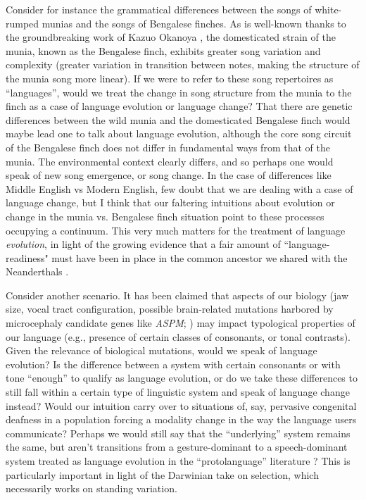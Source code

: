 Consider for instance the grammatical differences between the songs of white-rumped munias and the songs of Bengalese finches. 
As is well-known thanks to the groundbreaking work of Kazuo Okanoya \citep{okanoya2004bengalese,okanoya2017sexual}, the domesticated strain of the munia, known as the Bengalese finch, exhibits greater song variation and complexity (greater variation in transition between notes, making the structure of the munia song more linear). If we were to refer to these song repertoires as ``languages'', would we treat the change in song structure from the munia to the finch as a case of language evolution or language change? That there are genetic differences between the wild munia and the domesticated Bengalese finch would maybe lead one to talk about language evolution, although the core song circuit of the Bengalese finch does not differ in fundamental ways from that of the munia. The environmental context clearly differs, and so perhaps one would speak of new song emergence, or song change. In the case of differences like Middle English vs Modern English, few doubt that we are dealing with a case of language change, but I think that our faltering intuitions about evolution or change in the munia vs. Bengalese finch situation point to these processes occupying a continuum. This very much matters for the treatment of language \textit{evolution}, in light of the growing evidence that a fair amount of ``language-readiness" must have been in place in the common ancestor we shared with the Neanderthals \citep{dediu2013antiquity}.

Consider another scenario. It has been claimed that aspects of our biology (jaw size, vocal tract configuration, possible brain-related mutations harbored by microcephaly candidate genes like \textit{ASPM}; \cite{dediu2017language,blasi2019human,dediu2007linguistic,dediu2021tone}) may impact typological properties of our language (e.g., presence of certain classes of consonants, or tonal contrasts). Given the relevance of biological mutations, would we speak of language evolution? Is the difference between a system with certain consonants or with tone ``enough'' to qualify as language evolution, or do we take these differences to still fall within a certain type of linguistic system and speak of language change instead? Would our intuition carry over to situations of, say, pervasive congenital deafness in a population forcing a modality change in the way the language users communicate? Perhaps we would still say that the ``underlying'' system remains the same, but aren't transitions from a gesture-dominant to a speech-dominant system treated as language evolution in the ``protolanguage'' literature \citep{fitch2010evolution}? This is particularly important in light of the Darwinian take on selection, which necessarily works on standing variation.

